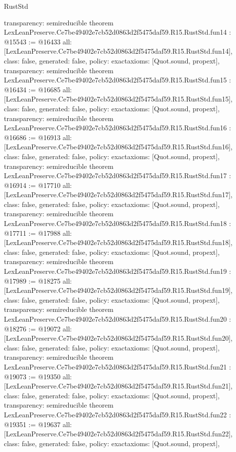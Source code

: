 \begin{lexlean}{RustStd}
\begin{coremodule}
{  transparency: semireducible
}
theorem LexLeanPreserve.Ce7be49402e7cb52d0863d2f5475daf59.R15.RustStd.fun14 : @15543 := @16433 {
  all: [LexLeanPreserve.Ce7be49402e7cb52d0863d2f5475daf59.R15.RustStd.fun14],
  class: false,
  generated: false,
  policy: exact{axioms: [Quot.sound, propext]},
  transparency: semireducible
}
theorem LexLeanPreserve.Ce7be49402e7cb52d0863d2f5475daf59.R15.RustStd.fun15 : @16434 := @16685 {
  all: [LexLeanPreserve.Ce7be49402e7cb52d0863d2f5475daf59.R15.RustStd.fun15],
  class: false,
  generated: false,
  policy: exact{axioms: [Quot.sound, propext]},
  transparency: semireducible
}
theorem LexLeanPreserve.Ce7be49402e7cb52d0863d2f5475daf59.R15.RustStd.fun16 : @16686 := @16913 {
  all: [LexLeanPreserve.Ce7be49402e7cb52d0863d2f5475daf59.R15.RustStd.fun16],
  class: false,
  generated: false,
  policy: exact{axioms: [Quot.sound, propext]},
  transparency: semireducible
}
theorem LexLeanPreserve.Ce7be49402e7cb52d0863d2f5475daf59.R15.RustStd.fun17 : @16914 := @17710 {
  all: [LexLeanPreserve.Ce7be49402e7cb52d0863d2f5475daf59.R15.RustStd.fun17],
  class: false,
  generated: false,
  policy: exact{axioms: [Quot.sound, propext]},
  transparency: semireducible
}
theorem LexLeanPreserve.Ce7be49402e7cb52d0863d2f5475daf59.R15.RustStd.fun18 : @17711 := @17988 {
  all: [LexLeanPreserve.Ce7be49402e7cb52d0863d2f5475daf59.R15.RustStd.fun18],
  class: false,
  generated: false,
  policy: exact{axioms: [Quot.sound, propext]},
  transparency: semireducible
}
theorem LexLeanPreserve.Ce7be49402e7cb52d0863d2f5475daf59.R15.RustStd.fun19 : @17989 := @18275 {
  all: [LexLeanPreserve.Ce7be49402e7cb52d0863d2f5475daf59.R15.RustStd.fun19],
  class: false,
  generated: false,
  policy: exact{axioms: [Quot.sound, propext]},
  transparency: semireducible
}
theorem LexLeanPreserve.Ce7be49402e7cb52d0863d2f5475daf59.R15.RustStd.fun20 : @18276 := @19072 {
  all: [LexLeanPreserve.Ce7be49402e7cb52d0863d2f5475daf59.R15.RustStd.fun20],
  class: false,
  generated: false,
  policy: exact{axioms: [Quot.sound, propext]},
  transparency: semireducible
}
theorem LexLeanPreserve.Ce7be49402e7cb52d0863d2f5475daf59.R15.RustStd.fun21 : @19073 := @19350 {
  all: [LexLeanPreserve.Ce7be49402e7cb52d0863d2f5475daf59.R15.RustStd.fun21],
  class: false,
  generated: false,
  policy: exact{axioms: [Quot.sound, propext]},
  transparency: semireducible
}
theorem LexLeanPreserve.Ce7be49402e7cb52d0863d2f5475daf59.R15.RustStd.fun22 : @19351 := @19637 {
  all: [LexLeanPreserve.Ce7be49402e7cb52d0863d2f5475daf59.R15.RustStd.fun22],
  class: false,
  generated: false,
  policy: exact{axioms: [Quot.sound, propext]},
}
\end{coremodule}
\end{lexlean}

